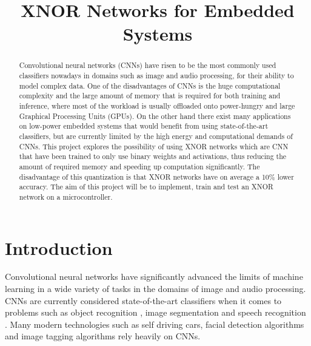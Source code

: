 \documentclass[conference]{IEEEtran}
\begin{document}
\title{XNOR Networks for Embedded Systems}

\author{
\and
{}
}

\maketitle

\begin{abstract}
Convolutional neural networks (CNNs) have risen to be the most commonly used classifiers nowadays in domains such as image and audio processing, for their ability to model complex data. One of the disadvantages of CNNs is the huge computational complexity and the large amount of memory that is required for both training and inference, where most of the workload is usually offloaded onto power-hungry and large Graphical Processing Units (GPUs). On the other hand there exist many applications on low-power embedded systems that would benefit from using state-of-the-art classifiers, but are currently limited by the high energy and computational demands of CNNs. This project explores the possibility of using XNOR networks which are CNN that have been trained to only use binary weights and activations, thus reducing the amount of required memory and speeding up computation significantly. The disadvantage of this quantization is that XNOR networks have on average a 10\% lower accuracy. The aim of this project will be to implement, train and test an XNOR network on a microcontroller.
\end{abstract}

\section{Introduction}
Convolutional neural networks have significantly advanced the limits of machine learning in a wide variety of tasks in the domains of image and audio processing. CNNs are currently considered state-of-the-art classifiers when it comes to problems such as object recognition \cite{best1}, image segmentation \cite{best2} and speech recognition \cite{best3}. Many modern technologies such as self driving cars, facial detection algorithms and image tagging algorithms rely heavily on CNNs.
\end{document}
